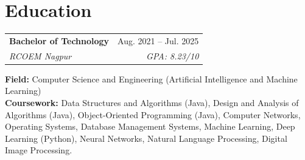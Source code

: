 \documentclass[a4paper,11pt]{article}
\begin{document}
\section{Education}
\begin{tabularx}{\textwidth}{@{}Xr@{}}
  \textbf{Bachelor of Technology} & Aug. 2021 -- Jul. 2025 \\
  \textit{\small RCOEM Nagpur} & \textit{\small GPA: 8.23/10} \\
\end{tabularx}
\small\textbf{Field:} Computer Science and Engineering (Artif{}icial Intelligence and Machine Learning)\\
\small\textbf{Coursework:} Data Structures and Algorithms (Java), Design and Analysis of Algorithms (Java), Object-Oriented Programming (Java), Computer Networks, Operating Systems, Database Management Systems, Machine Learning, Deep Learning (Python), Neural Networks, Natural Language Processing, Digital Image Processing.
\end{document}
